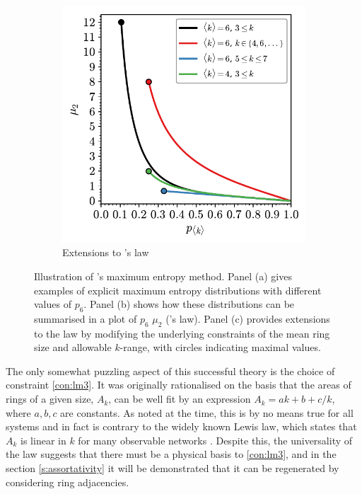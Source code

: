 \begin{figure}[bt]
     \vspace{2mm}
      \begin{subfigure}[b]{0.45\textwidth}
         \centering
         \includegraphics[width=\textwidth]{./figures/methods/lm_3.pdf}
         \caption{Extensions to \lm's law}
         \label{fig:lm3}
     \end{subfigure}
     \hfill

    
     \caption{Illustration of \lm's maximum entropy method. Panel (a) gives examples of explicit maximum entropy distributions with different values of $p_6$. Panel (b) shows how these distributions can be summarised in a plot of $p_6$ \vs{} $\mu_2$ (\lm's law). Panel (c) provides extensions to the law by modifying the underlying constraints of the mean ring size and allowable $k$\--range, with circles indicating maximal values.}
     \label{fig:lm}
\end{figure}

The only somewhat puzzling aspect of this successful theory is the choice of constraint \eqref{con:lm3}.
It was originally rationalised on the basis that the areas of rings of a given size, $A_k$, can be well fit by an expression $A_k = ak+b+c/k$, where $a,b,c$ are constants.
As noted at the time, this is by no means true for all systems and in fact is contrary to the widely known Lewis law, which states that $A_k$ is linear in $k$ for many observable networks \cite{Lewis1928,Fortes1995,Kim2014}.
Despite this, the universality of the \lm{} law suggests that there must be a physical basis to \eqref{con:lm3}, and in the section \ref{s:assortativity} it will be demonstrated that it can be regenerated by considering ring adjacencies.


